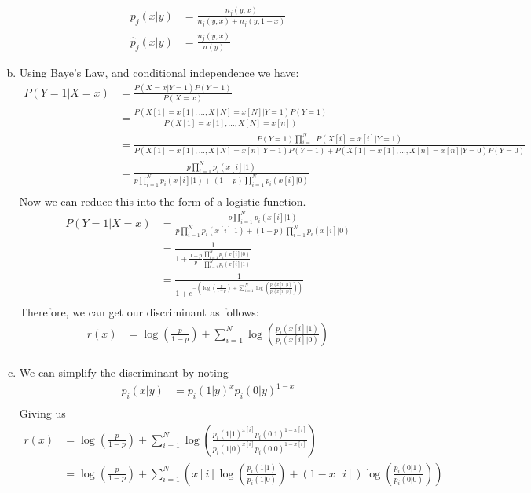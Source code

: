 \documentclass{amsart}
\theoremstyle{definition}
\begin{document}
\begin{enumerate}[(a)]
\begin{align*}
			p_j(x|y) &= \frac{n_j(y,x)}{n_j(y,x) + n_j(y, 1-x)} \\
			\hat{p}_j(x|y) &= \frac{n_j(y,x)}{n(y)}
		\end{align*}
	\item 
		Using Baye's Law, and conditional independence we have:
		\begin{align*}
			P(Y = 1|X = x) &= \frac{P(X = x| Y= 1)P(Y=1)}{P(X = x)}\\
			&= \frac{P(X[1] = x[1], \ldots, X[N] = x[N]| Y = 1) P(Y = 1)}{P(X[1] = x[1], \ldots, X[N] = x[n])}\\
			&= \frac{P(Y=1)\prod_{i=1}^{N} P(X[i] = x[i]|Y=1)}{P(X[1] = x[1], \ldots, X[N] = x[n]|Y = 1)P(Y = 1) + P(X[1] = x[1], \ldots, X[n] = x[n]| Y = 0) P(Y=0)}\\
			&= \frac{p \prod_{i=1}^{N}p_i(x[i]|1)}{p\prod_{i=1}^{N}p_i(x[i]|1) + (1-p)\prod_{i=1}^{N}p_i(x[i]|0)}\\
		\end{align*}
		Now we can reduce this into the form of a logistic function.
		\begin{align*}
			P(Y = 1|X = x) &= \frac{p \prod_{i=1}^{N}p_i(x[i]|1)}{p\prod_{i=1}^{N}p_i(x[i]|1) + (1-p)\prod_{i=1}^{N}p_i(x[i]|0)}\\
			&= \frac{1}{1 + \frac{1-p}{p}\frac{\prod_{i=1}^{N}p_i(x[i]|0)}{\prod_{i=1}^{N}p_i(x[i]|1)}}\\
			&= \frac{1}{1 + e^{-(\log(\frac{p}{1-p}) + \sum_{i=1}^{N}\log(\frac{p_i(x[i]|1)}{p_i(x[i]|0)}))}}\\
		\end{align*}
		Therefore, we can get our discriminant as follows:
		\begin{align*}
			r(x) &= \log\left(\frac{p}{1-p}\right) + \sum_{i=1}^{N}\log\left(\frac{p_i(x[i]|1)}{p_i(x[i]|0)}\right)\\
		\end{align*}	
	\item 
		We can simplify the discriminant by noting
		\begin{align*}
			p_i(x|y) &= p_i(1|y)^{x}p_i(0|y)^{1-x}\\
		\end{align*}
		Giving us
		\begin{align*}
			r(x) &= \log\left(\frac{p}{1-p}\right) + \sum_{i=1}^{N}\log\left(\frac{p_i(1|1)^{x[i]}p_i(0|1)^{1-x[i]}}{p_i(1|0)^{x[i]}p_i(0|0)^{1-x[i]}}\right)\\
			&= \log\left(\frac{p}{1-p}\right) + \sum_{i=1}^{N}\left(x[i]\log\left(\frac{p_i(1|1)}{p_i(1|0)}\right) + (1-x[i])\log\left(\frac{p_i(0|1)}{p_i(0|0)}\right)\right)\\

\end{align*}
\end{enumerate}
\end{document}
